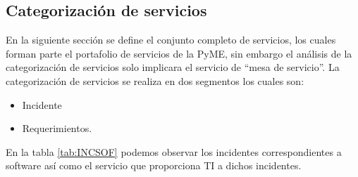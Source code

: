 \subsection{Categorización de servicios}
En la siguiente sección se define el  conjunto completo de servicios, los cuales forman parte el portafolio de servicios de la PyME, sin embargo el análisis de la categorización de servicios solo implicara el servicio de “mesa de servicio”. 
La categorización de servicios se realiza en dos segmentos los cuales son:
\begin{itemize}
	\item Incidente
	\item Requerimientos. 
\end{itemize}


En la tabla \ref{tab:INCSOF} podemos observar los incidentes correspondientes a software así como el servicio que proporciona TI a dichos incidentes.




